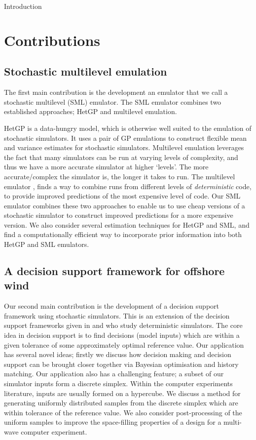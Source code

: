 \begin{chapter}{Introduction \label{Ch:Intro}}
\section{Contributions}
\subsection{Stochastic multilevel emulation}
The first main contribution is the development an emulator that we call a stochastic multilevel (SML) emulator. The SML emulator combines two established approaches; HetGP and multilevel emulation.

HetGP \citep{Goldberg1998, Binois2018} is a data-hungry model, which is otherwise well suited to the emulation of stochastic simulators. It uses a pair of GP emulations to construct flexible mean and variance estimates for stochastic simulators. Multilevel emulation leverages the fact that many simulators can be run at varying levels of complexity, and thus we have a more accurate simulator at higher `levels'. The more accurate/complex the simulator is, the longer it takes to run. The multilevel emulator \citep{Kennedy2000}, finds a way to combine runs from different levels of \textit{deterministic} code, to provide improved predictions of the most expensive level of code. Our SML emulator combines these two approaches to enable us to use cheap versions of a stochastic simulator to construct improved predictions for a more expensive version. We also consider several estimation techniques for HetGP and SML, and find a computationally efficient way to incorporate prior information into both HetGP and SML emulators.

\subsection{A decision support framework for offshore wind}
Our second main contribution is the development of a decision support framework using stochastic simulators. This is an extension of the decision support frameworks given in \citet{Lawson2016} and \citet{Owen2020} who study deterministic simulators. The core idea in decision support is to find decisions (model inputs) which are within a given tolerance of some approximately optimal reference value. Our application has several novel ideas; firstly we discuss how decision making and decision support can be brought closer together via Bayesian optimisation and history matching. Our application also has a challenging feature; a subset of our simulator inputs form a discrete simplex. Within the computer experiments literature, inputs are usually formed on a hypercube. We discuss a method for generating uniformly distributed samples from the discrete simplex which are within tolerance of the reference value. We also consider post-processing of the uniform samples to improve the space-filling properties of a design for a multi-wave computer experiment.


\end{chapter}
